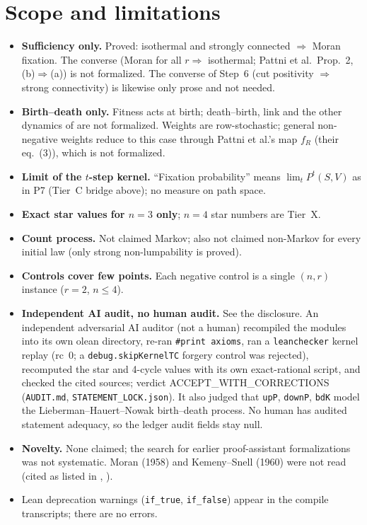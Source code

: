 \documentclass[11pt]{article}
\newcommand{\lean}[1]{\texttt{#1}}
\begin{document}
\section{Scope and limitations}\label{sec:limits}
\begin{itemize}\setlength\itemsep{1pt}
\item \textbf{Sufficiency only.} Proved: isothermal and strongly connected $\Rightarrow$ Moran fixation. The converse (Moran for all $r\Rightarrow$ isothermal; Pattni et al.\ Prop.~2, (b)$\Rightarrow$(a)) is not formalized. The converse of Step~6 (cut positivity $\Rightarrow$ strong connectivity) is likewise only prose and not needed.
\item \textbf{Birth--death only.} Fitness acts at birth; death--birth, link and the other dynamics of \cite{PBRS} are not formalized. Weights are row-stochastic; general non-negative weights reduce to this case through Pattni et al.'s map $f_R$ (their eq.~(3)), which is not formalized.
\item \textbf{Limit of the $t$-step kernel.} ``Fixation probability'' means $\lim_t P^t(S,V)$ as in P7 (Tier~C bridge above); no measure on path space.
\item \textbf{Exact star values for $n=3$ only}; $n=4$ star numbers are Tier~X.
\item \textbf{Count process.} Not claimed Markov; also not claimed non-Markov for every initial law (only strong non-lumpability is proved).
\item \textbf{Controls cover few points.} Each negative control is a single $(n,r)$ instance ($r=2$, $n\le4$).
\item \textbf{Independent AI audit, no human audit.} See the disclosure. An independent adversarial AI auditor (not a human) recompiled the modules into its own olean directory, re-ran \lean{\#print axioms}, ran a \lean{leanchecker} kernel replay (rc~0; a \lean{debug.skipKernelTC} forgery control was rejected), recomputed the star and 4-cycle values with its own exact-rational script, and checked the cited sources; verdict ACCEPT\_WITH\_CORRECTIONS (\texttt{AUDIT.md}, \texttt{STATEMENT\_LOCK.json}). It also judged that \lean{upP}, \lean{downP}, \lean{bdK} model the Lieberman--Hauert--Nowak birth--death process. No human has audited statement adequacy, so the ledger audit fields stay null.
\item \textbf{Novelty.} None claimed; the search for earlier proof-assistant formalizations was not systematic. Moran (1958) and Kemeny--Snell (1960) were not read (cited as listed in \cite{KU}, \cite{PBRS}).
\item Lean deprecation warnings (\lean{if\_true}, \lean{if\_false}) appear in the compile transcripts; there are no errors.
\end{itemize}
\end{document}
